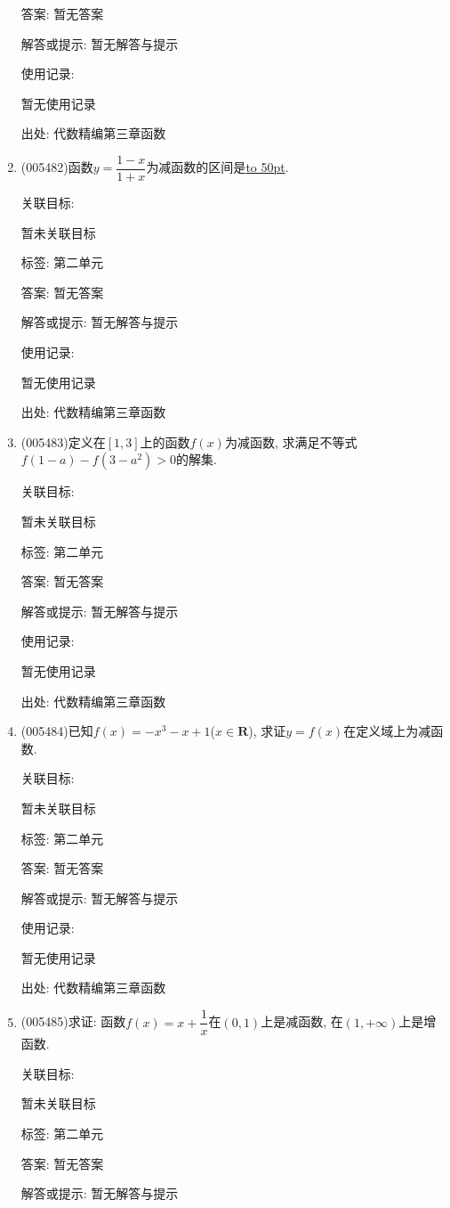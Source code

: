 \documentclass[10pt,a4paper]{article}
\newcommand{\blank}[1]{\underline{\hbox to #1pt{}}}
\begin{document}
\begin{enumerate}[1.]
答案: 暂无答案

解答或提示: 暂无解答与提示

使用记录:

暂无使用记录


出处: 代数精编第三章函数
\item { (005482)}函数$y=\dfrac{1-x}{1+x}$为减函数的区间是\blank{50}.


关联目标:

暂未关联目标



标签: 第二单元

答案: 暂无答案

解答或提示: 暂无解答与提示

使用记录:

暂无使用记录


出处: 代数精编第三章函数
\item { (005483)}定义在$[1, 3]$上的函数$f(x)$为减函数, 求满足不等式$f(1-a)-f(3-a^2)>0$的解集.


关联目标:

暂未关联目标



标签: 第二单元

答案: 暂无答案

解答或提示: 暂无解答与提示

使用记录:

暂无使用记录


出处: 代数精编第三章函数
\item { (005484)}已知$f(x)=-x^3-x+1$($x\in \mathbf{R}$), 求证$y=f(x)$在定义域上为减函数.


关联目标:

暂未关联目标



标签: 第二单元

答案: 暂无答案

解答或提示: 暂无解答与提示

使用记录:

暂无使用记录


出处: 代数精编第三章函数
\item { (005485)}求证: 函数$f(x)=x+\dfrac 1x$在$(0, 1)$上是减函数, 在$(1,+\infty)$上是增函数.


关联目标:

暂未关联目标



标签: 第二单元

答案: 暂无答案

解答或提示: 暂无解答与提示


\end{enumerate}
\end{document}
